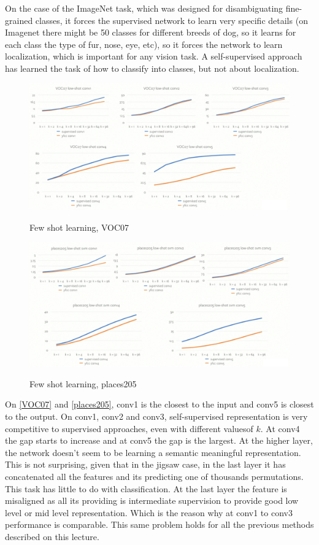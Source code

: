 On the case of the ImageNet task, which was designed for disambiguating fine-grained classes, it forces the supervised network to learn very specific details (on Imagenet there might be 50 classes for different breeds of dog, so it learns for each class the type of fur, nose, eye, etc), so it forces the network to learn localization, which is important for any vision task. A self-supervised approach has learned the task of how to classify into classes, but not about localization.

\begin{figure}[htb!]
\centering
\includegraphics[width=0.8\linewidth]{lectures/14-b/graphics/VOC07.png}
\label{fig:VOC07}
\caption{Few shot learning, VOC07}
\end{figure}
\begin{figure}[htb!]
\centering
\includegraphics[width=0.8\linewidth]{lectures/14-b/graphics/places205.png}
\label{fig:places205}
\caption{Few shot learning, places205}
\end{figure}

On \ref{VOC07} and \ref{places205}, conv1 is the closest to the input and conv5 is closest to the output. On conv1, conv2 and conv3, self-supervised representation is very competitive to supervised approaches, even with different valuesof $k$. At conv4 the gap starts to increase and at conv5 the gap is the largest. At the higher layer, the network doesn't seem to be learning a semantic meaningful representation. This is not surprising, given that in the jigsaw case, in the last layer it has concatenated all the features and its predicting one of thousands permutations. This task has little to do with classification. At the last layer the feature is misaligned as all its providing is intermediate supervision to provide good low level or mid level representation. Which is the reason why at conv1 to conv3 performance is comparable. This same problem holds for all the previous methods described on this lecture. 

